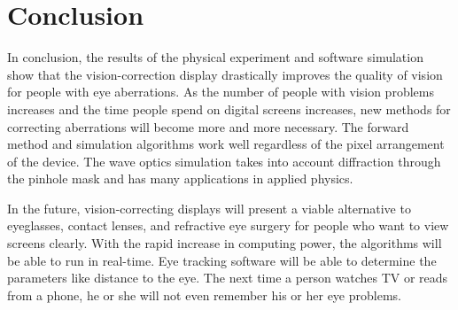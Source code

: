 \chapter{Conclusion}

In conclusion, the results of the physical experiment and software simulation show that the vision-correction display drastically improves the quality of vision for people with eye aberrations. As the number of people with vision problems increases and the time people spend on digital screens increases, new methods for correcting aberrations will become more and more necessary. The forward method and simulation algorithms work well regardless of the pixel arrangement of the device. The wave optics simulation takes into account diffraction through the pinhole mask and has many applications in applied physics. 

In the future, vision-correcting displays will present a viable alternative to eyeglasses, contact lenses, and refractive eye surgery for people who want to view screens clearly. With the rapid increase in computing power, the algorithms will be able to run in real-time. Eye tracking software will be able to determine the parameters like distance to the eye. The next time a person watches TV or reads from a phone, he or she will not even remember his or her eye problems.

